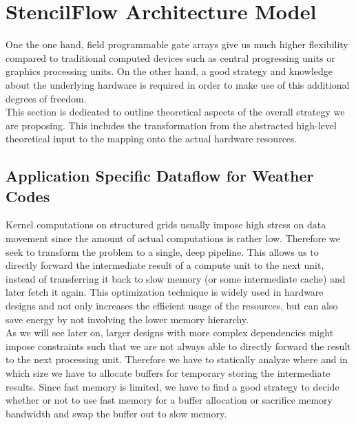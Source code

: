 \chapter{StencilFlow Architecture Model}
One the one hand, field programmable gate arrays give us much higher flexibility compared to traditional computed devices such as central progressing units or graphics processing units. On the other hand, a good strategy and knowledge about the underlying hardware is required in order to make use of this additional degrees of freedom.\\
This section is dedicated to outline theoretical aspects of the overall strategy we are proposing. This includes the transformation from the abstracted high-level theoretical input to the mapping onto the actual hardware resources. 



\section{Application Specific Dataflow for Weather Codes}
Kernel computations on structured grids usually impose high stress on data movement since the amount of actual computations is rather low. Therefore we seek to transform the problem to a single, deep pipeline. This allows us to directly forward the intermediate result of a compute unit to the next   unit, instead of transferring it back to slow memory (or some intermediate cache) and later fetch it again. This optimization technique is widely used in hardware designs and not only increases the efficient usage of the resources, but can also save energy by not involving the lower memory hierarchy.\\
As we will see later on, larger designs with more complex dependencies might impose constraints such that we are not always able to directly forward the result to the next processing unit. Therefore we have to statically analyze where and in which size we have to allocate buffers for temporary storing the intermediate results. Since fast memory is limited, we have to find a good strategy to decide whether or not to use fast memory for a buffer allocation or sacrifice memory bandwidth and swap the buffer out to slow memory.


